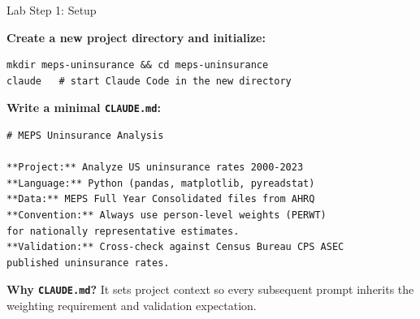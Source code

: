 \documentclass[10pt,english,aspectratio=169]{beamer}
\begin{document}
\begin{frame}[fragile]{Lab Step 1: Setup}

\textbf{Create a new project directory and initialize:}

\begin{lstlisting}[style=bashstyle]
mkdir meps-uninsurance && cd meps-uninsurance
claude   # start Claude Code in the new directory
\end{lstlisting}

\vspace{0.2cm}
\textbf{Write a minimal \texttt{CLAUDE.md}:}

\begin{lstlisting}[style=markdownstyle, basicstyle=\ttfamily\scriptsize]
# MEPS Uninsurance Analysis

**Project:** Analyze US uninsurance rates 2000-2023
**Language:** Python (pandas, matplotlib, pyreadstat)
**Data:** MEPS Full Year Consolidated files from AHRQ
**Convention:** Always use person-level weights (PERWT)
for nationally representative estimates.
**Validation:** Cross-check against Census Bureau CPS ASEC
published uninsurance rates.
\end{lstlisting}

\vspace{0.2cm}
\textbf{Why \texttt{CLAUDE.md}?} It sets project context so every subsequent prompt inherits the weighting requirement and validation expectation.

\end{frame}
\end{document}
